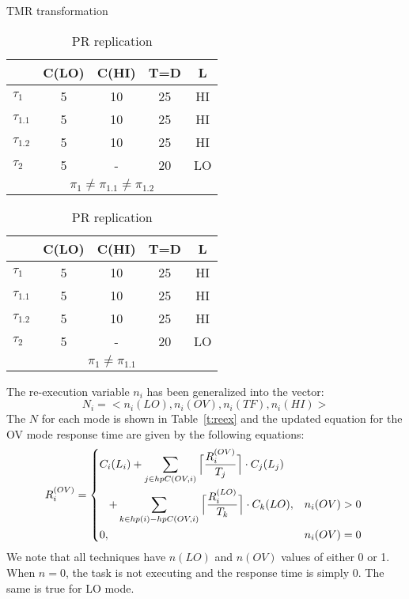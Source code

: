 \begin{table}
	\begin{subtable}{0.3\textwidth}
		\caption{TMR transformation}
		\begin{tabular}{@{}l|cccc@{}}
		\toprule
				& C(LO) & C(HI) & T=D & L	 \\\bottomrule
		$\tau_1$ & 5 & 10 & 25 & HI  \\
		$\tau_{1.1}$ & 5 & 10 & 25 & HI  \\
		$\tau_{1.2}$ & 5 & 10 & 25 & HI  \\
		$\tau_2$ & 5 & - & 20 & LO  \\
		\multicolumn{5}{c}{$\pi_1 \ne \pi_{1.1} \ne \pi_{1.2}$}
		\end{tabular}
	\end{subtable} \hspace{2cm}
	\begin{subtable}{0.3\textwidth}
		\caption{PR replication}
		\begin{tabular}{@{}l|cccc@{}}
		\toprule
		& C(LO) & C(HI) & T=D & L	 \\\bottomrule
		$\tau_1$ & 5 & 10 & 25 & HI  \\
		$\tau_{1.1}$ & 5 & 10 & 25 & HI  \\
		$\tau_{1.2}$ & 5 & 10 & 25 & HI  \\
		$\tau_2$ & 5 & - & 20 & LO  \\
		\multicolumn{5}{c}{$\pi_1 \ne \pi_{1.1}$}
		\end{tabular}
	\end{subtable}
\end{table}


	The re-execution variable $n_i$ has been generalized into the vector:
\begin{equation}
	N_i=<n_i(LO),n_i(OV),n_i(TF),n_i(HI)>
\end{equation} 
	The $N$ for each mode is shown in Table~\ref{t:reex} and the updated equation for the OV mode response time are given by the following equations:
	\begin{equation}
\begin{aligned}
R_i^{(OV)} =
\begin{dcases*}
C_i(L_i)\color{red} \color{black}+\sum_{j \in hpC(OV,i)}\Big\lceil\frac{R_i^{(OV)}}{T_j}\Big\rceil \cdot C_j(L_j) \\
\hspace{0.3cm} +\sum_{k \in hp(i)-hpC(OV,i)}\Big\lceil\frac{R_i^{(LO)}}{T_k}\Big\rceil \cdot C_k(LO), &  $n_i(OV)>0$ \\
	0, & $n_i(OV)=0$
\end{dcases*}
   \end{aligned}
\end{equation}
	We note that all techniques have $n(LO)$ and $n(OV)$ values of either 0 or 1. When $n=0$, the task is not executing and the response time is simply 0. The same is true for LO mode.
	
